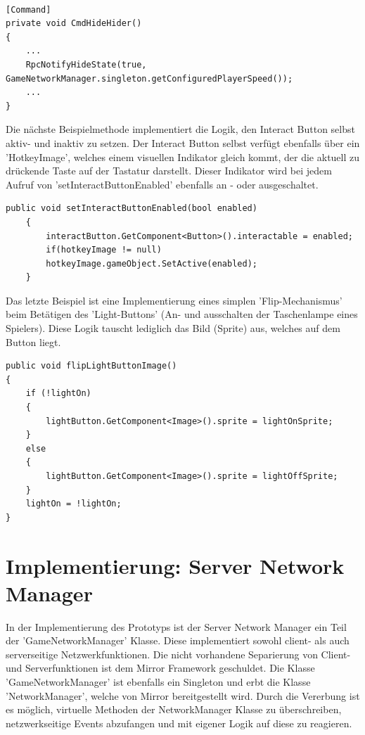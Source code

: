 \begin{lstlisting}[caption= HiderScript.cs Subscribe to InGameUiControllerScript Event]
	
[Command]
private void CmdHideHider()
{
	...
	RpcNotifyHideState(true, GameNetworkManager.singleton.getConfiguredPlayerSpeed());
	...
}	
\end{lstlisting}

Die nächste Beispielmethode implementiert die Logik, den Interact Button selbst aktiv- und inaktiv zu setzen. Der Interact Button selbst verfügt ebenfalls über ein 'HotkeyImage', welches einem visuellen Indikator gleich kommt, der die aktuell zu drückende Taste auf der Tastatur darstellt. Dieser Indikator wird bei jedem Aufruf von 'setInteractButtonEnabled' ebenfalls an - oder ausgeschaltet.

\begin{lstlisting}[caption= InGameUiControllerScript.cs setInteractButtonEnabled]
public void setInteractButtonEnabled(bool enabled)
	{
		interactButton.GetComponent<Button>().interactable = enabled;
		if(hotkeyImage != null)
		hotkeyImage.gameObject.SetActive(enabled);
	}
\end{lstlisting}

Das letzte Beispiel ist eine Implementierung eines simplen 'Flip-Mechanismus' beim Betätigen des 'Light-Buttons' (An- und ausschalten der Taschenlampe eines Spielers). Diese Logik tauscht lediglich das Bild (Sprite) aus, welches auf dem Button liegt.

\begin{lstlisting}[caption= InGameUiControllerScript.cs flipLightButtonImage]
public void flipLightButtonImage()
{
	if (!lightOn)
	{
		lightButton.GetComponent<Image>().sprite = lightOnSprite;
	}
	else
	{
		lightButton.GetComponent<Image>().sprite = lightOffSprite;
	}
	lightOn = !lightOn;
}
\end{lstlisting}


\section{Implementierung: Server Network Manager}

In der Implementierung des Prototyps ist der Server Network Manager ein Teil der 'GameNetworkManager' Klasse. Diese implementiert sowohl client- als auch serverseitige Netzwerkfunktionen. Die nicht vorhandene Separierung von Client- und Serverfunktionen ist dem Mirror Framework geschuldet. Die Klasse 'GameNetworkManager' ist ebenfalls ein Singleton und erbt die Klasse 'NetworkManager', welche von Mirror bereitgestellt wird. Durch die Vererbung ist es möglich, virtuelle Methoden\cite{Billwagner.08.02.2022} der NetworkManager Klasse zu überschreiben, netzwerkseitige Events abzufangen und mit eigener Logik auf diese zu reagieren. 

